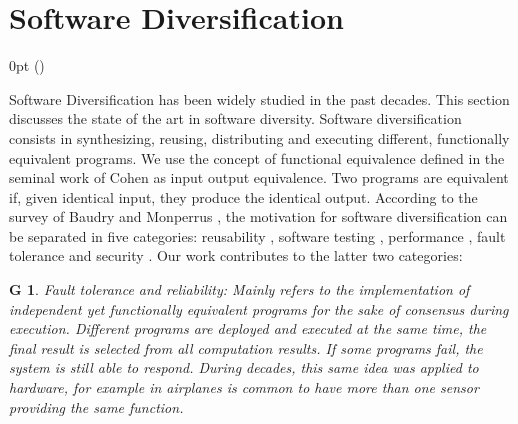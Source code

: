 \section{Software Diversification}
\label{sota:sota}
\def\checkmark{\tikz\fill[scale=0.4](0,.35) -- (.25,0) -- (1,.7) -- (.25,.15) -- cycle;} 

  {\topsep}%
  {\topsep}%
  {\itshape}%
  {0pt}%
  {\bfseries}%
  {}%
  { }%
  {()\textnormal{}}

\def\Gnospace~{G{}}
\theoremstyle{sota}
\newtheorem{goal}{G}
\providecommand*{\definitionautorefname}{\Gnospace}
\newcommand{\goalautorefname}{\Gnospace}


\def\Snospace~{S{}}
\theoremstyle{sota}
\newtheorem{strategy}{S}
\providecommand*{\definitionautorefname}{\Snospace}
\newcommand{\strategyautorefname}{\Snospace}

\def\Unospace~{U{}}
\theoremstyle{sota}
\newtheorem{usage}{U}
\providecommand*{\definitionautorefname}{\Unospace}
\newcommand{\usageautorefname}{\Unospace}

Software Diversification has been widely studied in the past decades. This section discusses the state of the art in software diversity.
Software diversification consists in synthesizing, reusing, distributing and executing different, functionally equivalent programs. We use the concept of functional equivalence defined in the seminal work of Cohen \etal \cite{cohen1993operating} as input output equivalence. Two programs are equivalent if, given identical input, they produce the identical output.
According to the survey of Baudry and Monperrus \cite{natural_diversity}, the motivation for software diversification can be separated in five categories: reusability \cite{pohl2005software}, software testing \cite{Chen2010AdaptiveRT}, performance \cite{10.1145/2025113.2025133}, fault tolerance \cite{1659219} and security \cite{cohen1993operating}. Our work contributes to the latter two categories: 

\begin{goal}{Fault tolerance and reliability:}
    \label{goal:reliability}
    \normalfont
    Mainly refers to the implementation of independent yet functionally equivalent programs for the sake of consensus during execution. Different programs are deployed and executed at the same time, the final result is selected from all computation results. If some programs fail, the system is still able to respond. During decades, this same idea was applied to hardware, for example in airplanes is common to have more than one sensor providing the same function. 
\end{goal}

